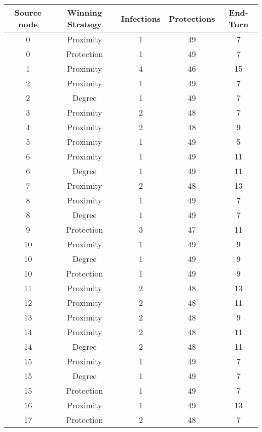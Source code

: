\documentclass[results.tex]{subfiles}
\begin{document}
\begin{center}
  \begin{tabular}{| c || c | c | c | c |}
    \hline
    {\bfseries Source node} & {\bfseries Winning Strategy} & {\bfseries Infections} & {\bfseries Protections} & {\bfseries End-Turn} \\  %
    \hline\hline
    0 & Proximity & 1 & 49 & 7 \\ 
    \hline
    0 & Protection & 1 & 49 & 7 \\ 
    \hline
    1 & Proximity & 4 & 46 & 15 \\ 
    \hline
    2 & Proximity & 1 & 49 & 7 \\ 
    \hline
    2 & Degree & 1 & 49 & 7 \\ 
    \hline
    3 & Proximity & 2 & 48 & 7 \\ 
    \hline
    4 & Proximity & 2 & 48 & 9 \\ 
    \hline
    5 & Proximity & 1 & 49 & 5 \\ 
    \hline
    6 & Proximity & 1 & 49 & 11 \\ 
    \hline
    6 & Degree & 1 & 49 & 11 \\ 
    \hline
    7 & Proximity & 2 & 48 & 13 \\ 
    \hline
    8 & Proximity & 1 & 49 & 7 \\ 
    \hline
    8 & Degree & 1 & 49 & 7 \\ 
    \hline
    9 & Protection & 3 & 47 & 11 \\ 
    \hline
    10 & Proximity & 1 & 49 & 9 \\ 
    \hline
    10 & Degree & 1 & 49 & 9 \\ 
    \hline
    10 & Protection & 1 & 49 & 9 \\ 
    \hline
    11 & Proximity & 2 & 48 & 13 \\ 
    \hline
    12 & Proximity & 2 & 48 & 11 \\ 
    \hline
    13 & Proximity & 2 & 48 & 9 \\ 
    \hline
    14 & Proximity & 2 & 48 & 11 \\ 
    \hline
    14 & Degree & 2 & 48 & 11 \\ 
    \hline
    15 & Proximity & 1 & 49 & 7 \\ 
    \hline
    15 & Degree & 1 & 49 & 7 \\ 
    \hline
    15 & Protection & 1 & 49 & 7 \\ 
    \hline
    16 & Proximity & 1 & 49 & 13 \\ 
    \hline
    17 & Protection & 2 & 48 & 7 \\ 

\end{tabular}
\end{center}
\end{document}
